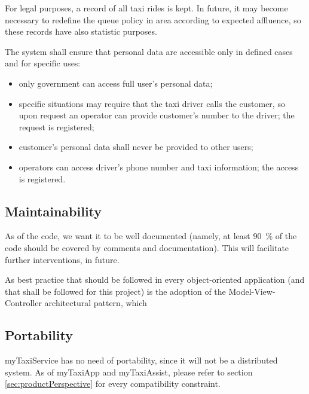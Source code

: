 For legal purposes, a record of all taxi rides is kept. In future, it may become necessary to redefine the queue policy in area according to expected affluence, so these records have also statistic purposes.

The system shall ensure that personal data are accessible only in defined cases and for specific uses: 
\begin{itemize}
	
	\item only government can access full user's personal data;
	
	\item specific situations may require that the taxi driver calls the customer, so upon request an operator can provide customer's number to the driver; the request is registered;
	
	\item customer's personal data shall never be provided to other users;
	
	\item operators can access driver's phone number and taxi information; the access is registered.

\end{itemize}


\subsection{Maintainability}
As of the code, we want it to be well documented (namely, at least \SI{90}{\percent} of the code should be covered by comments and documentation). This will facilitate further interventions, in future. 

As best practice that should be followed in every object-oriented application (and that shall be followed for this project) is the adoption of the Model-View-Controller architectural pattern, which 


\subsection{Portability}
myTaxiService has no need of portability, since it will not be a distributed system. As of myTaxiApp and myTaxiAssist, please refer to section \ref{sec:productPerspective} for every compatibility constraint.
